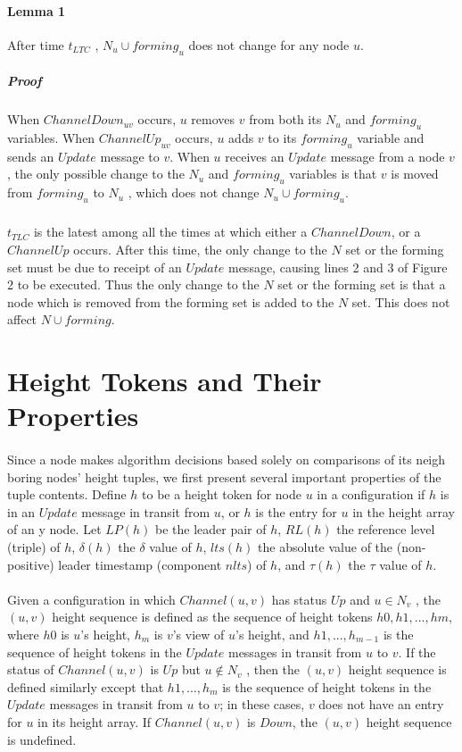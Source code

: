 \paragraph{Lemma 1}After time $t_{LTC}$ , $N_u \cup forming_u$ does not change for any node $u$.
\subparagraph{Proof}When $ChannelDown_{uv}$ occurs, $u$ removes $v$ from both its $N_u$ and $forming_u$ variables. When $ChannelUp_{uv}$ occurs, $u$ adds $v$ to its $forming_u$ variable and sends an $Update$ message to $v$. When $u$ receives an $Update$ message from a node $v$, the only possible change to the $N_u$ and $forming_u$ variables is that $v$ is moved from $forming_u$ to $N_u$ , which does not change $N_u \cup forming_u$.
\subparagraph{}$t_{TLC}$ is the latest among all the times at which either a $ChannelDown$, or a $ChannelUp$ occurs. After this time, the only change to the $N$ set or the forming set must be due to receipt of an $Update$ message, causing lines 2 and 3 of Figure 2 to be executed. Thus the only change to the $N$ set or the forming set is that a node which is removed from the forming set is added to the $N$ set. This does not affect $N \cup forming$.
\section{Height Tokens and Their Properties}
\paragraph{}Since a node makes algorithm decisions based solely on comparisons of its neigh boring nodes' height tuples, we first present several important properties of the tuple contents. Define $h$ to be a height token for node $u$ in a configuration if $h$ is in an $Update$ message in transit from $u$, or $h$ is the entry for $u$ in the height array of an                                y node. Let $LP(h)$ be the leader pair of $h$, $RL(h)$ the reference level (triple) of $h$, $\delta(h)$ the $\delta$ value of $h$, $lts(h)$ the absolute value of the (non-positive) leader timestamp (component $nlts$) of $h$, and $\tau (h)$ the $\tau$ value of $h$.
\paragraph{}Given a configuration in which $Channel(u, v)$ has status $Up$ and $u \in N_v$ , the $(u, v)$ height sequence is defined as the sequence of height tokens $h0, h1, ... , hm$, where $h0$ is $u$'s height, $h_m$ is $v$'s view of $u$'s height, and $h1 , . . . , h_{m-1}$ is the sequence of height tokens in the $Update$ messages in transit from $u$ to $v$. If the status of $Channel(u, v)$ is $Up$ but $u \not\in N_v$ , then the $(u, v)$ height sequence is defined similarly except that $h1, ... , h_m$ is the sequence of height tokens in the $Update$ messages in transit from $u$ to $v$; in these cases, $v$ does not have an entry for $u$ in its height array. If $Channel(u, v)$ is $Down$, the $(u, v)$ height sequence is undefined.
